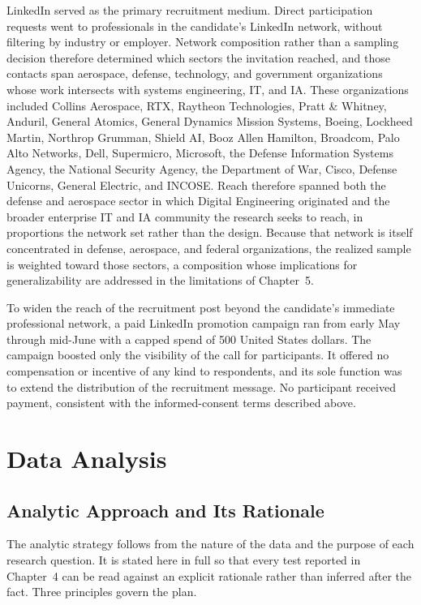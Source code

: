 LinkedIn served as the primary recruitment medium. Direct participation requests went to professionals in the candidate's LinkedIn network, without filtering by industry or employer. Network composition rather than a sampling decision therefore determined which sectors the invitation reached, and those contacts span aerospace, defense, technology, and government organizations whose work intersects with systems engineering, IT, and IA. These organizations included Collins Aerospace, RTX, Raytheon Technologies, Pratt \& Whitney, Anduril, General Atomics, General Dynamics Mission Systems, Boeing, Lockheed Martin, Northrop Grumman, Shield AI, Booz Allen Hamilton, Broadcom, Palo Alto Networks, Dell, Supermicro, Microsoft, the Defense Information Systems Agency, the National Security Agency, the Department of War, Cisco, Defense Unicorns, General Electric, and INCOSE. Reach therefore spanned both the defense and aerospace sector in which Digital Engineering originated and the broader enterprise IT and IA community the research seeks to reach, in proportions the network set rather than the design. Because that network is itself concentrated in defense, aerospace, and federal organizations, the realized sample is weighted toward those sectors, a composition whose implications for generalizability are addressed in the limitations of Chapter~5.

To widen the reach of the recruitment post beyond the candidate's immediate professional network, a paid LinkedIn promotion campaign ran from early May through mid-June with a capped spend of 500 United States dollars. The campaign boosted only the visibility of the call for participants. It offered no compensation or incentive of any kind to respondents, and its sole function was to extend the distribution of the recruitment message. No participant received payment, consistent with the informed-consent terms described above.

\section{Data Analysis}

\subsection{Analytic Approach and Its Rationale}

The analytic strategy follows from the nature of the data and the purpose of each research question. It is stated here in full so that every test reported in Chapter~4 can be read against an explicit rationale rather than inferred after the fact. Three principles govern the plan.

